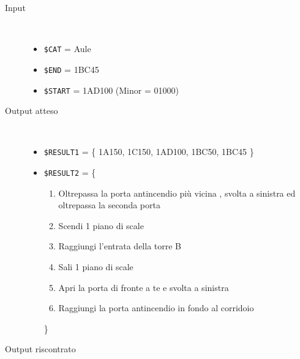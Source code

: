 \documentclass[../../Sperimentazione.tex]{subfiles}
\begin{document}
			\begin{tcolorbox}[fonttitle=\bfseries, 
								adjusted title={\Large Prova 1C.1}, 
								breakable, 
								sharp corners=south,
								colback=white, 
								colframe=white!60!black]
								
				\begin{description}%
				
					\item[Input] \ \par 
        				\begin{itemize}
        					\item \verb|$CAT| = Aule
							\item \verb|$END| = 1BC45
							\item \verb|$START| = 1AD100 (Minor = 01000)
        				\end{itemize}
        				
        			\tcbline 
        				
        			\item[Output atteso] \ \par
        				\begin{itemize}
        				
        					\item \verb|$RESULT1| = \{
        						1A150, 1C150, 1AD100, 1BC50, 1BC45
        					\}
        				
        					\item \verb|$RESULT2| = \{
        					\begin{enumerate}
        						\item Oltrepassa la porta antincendio più vicina , svolta a sinistra ed oltrepassa la seconda porta
        						\item Scendi 1 piano di scale
        						\item Raggiungi l'entrata della torre B
        						\item Sali 1 piano di scale
        						\item Apri la porta di fronte a te e svolta a sinistra
        						\item Raggiungi la porta antincendio in fondo al corridoio
        					\end{enumerate}
        					\}
        					
        				\end{itemize}

					\tcbline				
        				
        			\item[Output riscontrato] \ \par
        				\begin{description}
        				

\end{description}
\end{description}
\end{tcolorbox}
\end{document}

